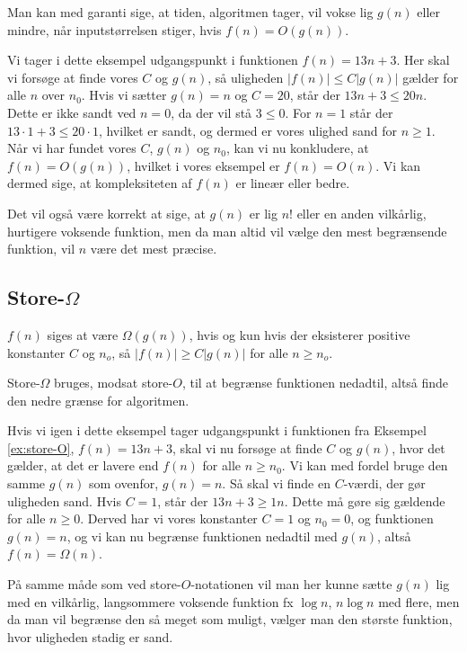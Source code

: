 Man kan med garanti sige, at tiden, algoritmen tager, vil vokse lig $g(n)$ eller mindre, når inputstørrelsen stiger, hvis $f(n)=O(g(n))$.

\begin{exmp} \label{ex:store-O}
Vi tager i dette eksempel udgangspunkt i funktionen $f(n)=13n+3$. 
Her skal vi forsøge at finde vores $C$ og $g(n)$, så uligheden $|f(n)| \leq C|g(n)|$ gælder for alle $n$ over $n_0$. Hvis vi sætter $g(n) = n$ og $C=20$, står der $13n+3 \leq 20n$. Dette er ikke sandt ved $n=0$, da der vil stå $3 \leq 0$. For $n=1$ står der $13\cdot 1 + 3 \leq 20 \cdot 1$, hvilket er sandt, og dermed er vores ulighed sand for $n \geq 1$.
Når vi har fundet vores $C$, $g(n)$ og $n_0$, kan vi nu konkludere, at $f(n) = O(g(n))$, hvilket i vores eksempel er $f(n) = O(n)$.
Vi kan dermed sige, at kompleksiteten af $f(n)$ er lineær eller bedre.
\end{exmp}
Det vil også være korrekt at sige, at $g(n)$ er lig $n!$ eller en anden vilkårlig, hurtigere voksende funktion, men da man altid vil vælge den mest begrænsende funktion, vil $n$ være det mest præcise. 

\subsection{Store-$\Omega$}
\begin{defn}
$f(n)$ siges at være  $\Omega(g(n))$, hvis og kun hvis der eksisterer positive konstanter $C$ og $n_o$, så $|f(n)| \geq C |g(n)|$ for alle $n \geq n_o$.
\end{defn}
Store-$\Omega$ bruges, modsat store-$O$, til at begrænse funktionen nedadtil, altså finde den nedre grænse for algoritmen.
\begin{exmp}
Hvis vi igen i dette eksempel tager udgangspunkt i funktionen fra Eksempel \ref{ex:store-O}, $f(n)=13n+3$, skal vi nu forsøge at finde $C$ og $g(n)$, hvor det gælder, at det er lavere end $f(n)$ for alle $n \geq n_0$. 
Vi kan med fordel bruge den samme $g(n)$ som ovenfor, $g(n)=n$. Så skal vi finde en $C$-værdi, der gør uligheden sand. Hvis $C=1$, står der $13n+3 \geq 1n$. Dette må gøre sig gældende for alle $n \geq 0$. Derved har vi vores konstanter $C=1$ og $n_0 = 0$, og funktionen $g(n)=n$, og vi kan nu begrænse funktionen nedadtil med $g(n)$, altså $f(n)=\Omega(n)$.
\end{exmp}

På samme måde som ved store-$O$-notationen vil man her kunne sætte $g(n)$ lig med en vilkårlig, langsommere voksende funktion fx $\log n$, $n \log n$ med flere, men da man vil begrænse den så meget som muligt, vælger man den største funktion, hvor uligheden stadig er sand.
